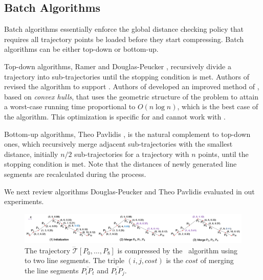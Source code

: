 \subsection{Batch Algorithms}

Batch algorithms essentially enforce the global distance checking policy that requires all trajectory points be loaded before they start compressing. %
Batch algorithms can be either top-down or bottom-up.

Top-down algorithms, \eg Ramer \cite{Ramer:Split} and Douglas-Peucker \cite{Douglas:Peucker}, recursively divide a trajectory into sub-trajectories until the stopping condition is met.
Authors of \cite{Meratnia:Spatiotemporal} revised the \dpa algorithm to support \sed.
Authors of \cite{Hershberger:Speeding} developed an improved method of \dpa, based on \emph{convex hulls}, that uses the geometric structure of the problem to attain a worst-case running time proportional to $O(n\log n)$, which is the best case of the \dpa algorithm. {This optimization is specific for \ped and cannot work with \sed.}

Bottom-up algorithms, \eg Theo Pavlidis \cite{Pavlidis:Segment}, is the natural complement to top-down ones, which recursively merge adjacent sub-trajectories with the smallest distance, initially $n/2$  sub-trajectories for a trajectory with $n$ points, until the stopping condition is met. Note that the distances of newly generated line segments are recalculated during the process.

We next review algorithms Douglas-Peucker and Theo Pavlidis evaluated in out experiments.

\begin{figure}[tb!]
	\centering
	\includegraphics[scale=0.55]{Figures/Fig-Pavlidis.png}
	\vspace{-5.5ex}
	\caption{\small The trajectory $\dddot{\mathcal{T}}[P_0, \ldots, P_{8}]$ is compressed by the \pavlidis~algorithm using \ped to two line segments. The triple $(i, j, cost)$ is the $cost$ of merging the line segments $\overline{P_iP_t}$ and $\overline{P_tP_j}$.} %
	\vspace{-2.5ex}
	\label{fig:pavlidis}
\end{figure}

